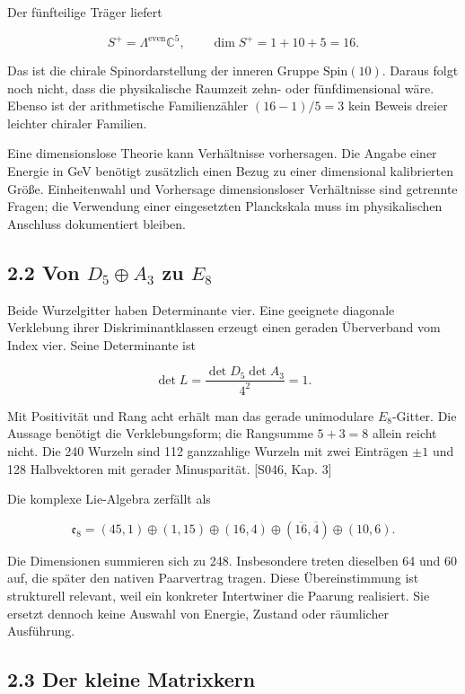 Der fünfteilige Träger liefert

\[S^+=\Lambda^{\mathrm{even}}\mathbb C^5,
\qquad \dim S^+=1+10+5=16.\]

Das ist die chirale Spinordarstellung der inneren Gruppe
\(\mathrm{Spin}(10)\). Daraus folgt noch nicht, dass die physikalische
Raumzeit zehn- oder fünfdimensional wäre. Ebenso ist der arithmetische
Familienzähler \((16-1)/5=3\) kein Beweis dreier leichter chiraler
Familien.

Eine dimensionslose Theorie kann Verhältnisse vorhersagen. Die Angabe
einer Energie in GeV benötigt zusätzlich einen Bezug zu einer
dimensional kalibrierten Größe. Einheitenwahl und Vorhersage
dimensionsloser Verhältnisse sind getrennte Fragen; die Verwendung einer
eingesetzten Planckskala muss im physikalischen Anschluss dokumentiert
bleiben.

\subsection{\texorpdfstring{2.2 Von \(D_5\oplus A_3\) zu
\(E_8\)}{2.2 Von D\_5\textbackslash oplus A\_3 zu E\_8}}\label{von-d_5oplus-a_3-zu-e_8}

Beide Wurzelgitter haben Determinante vier. Eine geeignete diagonale
Verklebung ihrer Diskriminantklassen erzeugt einen geraden Überverband
vom Index vier. Seine Determinante ist

\[\det L=\frac{\det D_5\det A_3}{4^2}=1.\]

Mit Positivität und Rang acht erhält man das gerade unimodulare
\(E_8\)-Gitter. Die Aussage benötigt die Verklebungsform; die Rangsumme
\(5+3=8\) allein reicht nicht. Die 240 Wurzeln sind 112 ganzzahlige
Wurzeln mit zwei Einträgen \(\pm1\) und 128 Halbvektoren mit gerader
Minusparität. {[}S046, Kap. 3{]}

Die komplexe Lie-Algebra zerfällt als

\[
\mathfrak e_8=(45,1)\oplus(1,15)\oplus(16,4)
\oplus(\overline{16},\overline4)\oplus(10,6).
\]

Die Dimensionen summieren sich zu 248. Insbesondere treten dieselben 64
und 60 auf, die später den nativen Paarvertrag tragen. Diese
Übereinstimmung ist strukturell relevant, weil ein konkreter Intertwiner
die Paarung realisiert. Sie ersetzt dennoch keine Auswahl von Energie,
Zustand oder räumlicher Ausführung.

\subsection{2.3 Der kleine Matrixkern}\label{der-kleine-matrixkern}


